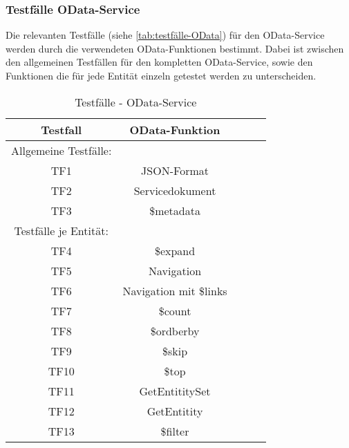 
\subsubsection{Testfälle OData-Service}
Die relevanten Testfälle (siehe \autoref{tab:testfälle-OData}) für den OData-Service werden durch die verwendeten OData-Funktionen bestimmt. Dabei ist zwischen den allgemeinen Testfällen für den kompletten OData-Service, sowie den Funktionen die für jede Entität einzeln getestet werden zu unterscheiden.

\begin{table}[h]
	\centering
\begin{tabular}{ccccc}
	\toprule Testfall & OData-Funktion  \\
	\midrule 	
	Allgemeine Testfälle: & \\
	\midrule
	TF1 & JSON-Format \\
	 	    	TF2 & Servicedokument \\
			TF3 & \$metadata\\
	\midrule
	Testfälle je Entität: & \\
	\midrule		
			TF4 & \$expand\\
			TF5 & Navigation\\
			TF6 & Navigation mit \$links\\
			TF7 & \$count \\
			TF8 & \$ordberby\\
			TF9 & \$skip\\
			TF10 & \$top\\
			TF11 & GetEntititySet\\
			TF12 & GetEntitity\\
			TF13 & \$filter\\
	\bottomrule 
\end{tabular} 
\caption{Testfälle - OData-Service}
\label{tab:testfälle-OData}
\end{table} 
